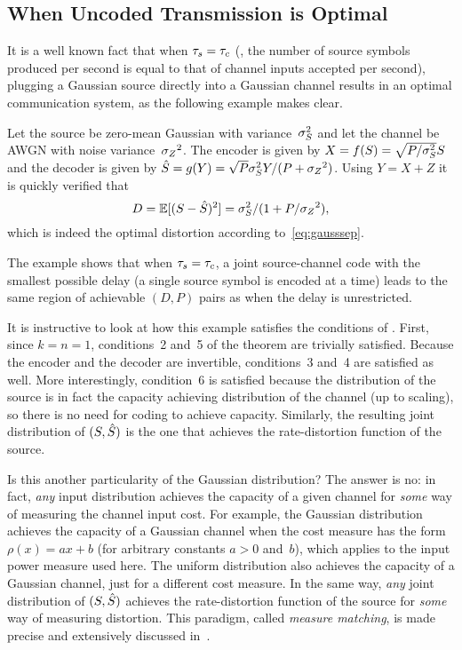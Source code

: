 \subsection{When Uncoded Transmission is Optimal}\label{sec:gaussuncoded}

It is a well known fact that when ${\tau_s} = {\tau_c}$ (\ie, the number of source symbols
produced per second is equal to that of channel inputs accepted per second),
plugging a Gaussian source directly into a Gaussian channel results in an
optimal communication system, as the following example makes clear.

\begin{example}
  \label{ex:gausssingle}
  Let the source be zero-mean Gaussian with variance~${\sigma_S^2}$ and let the channel
  be AWGN with noise variance~${{\sigma_Z}^2}$. The encoder is given by $X =
  f(S) = \sqrt{P/{\sigma_S^2}} S$ and the decoder is given by ${\hat{S}} = g(Y) = \sqrt{P}
  {\sigma_S^2} Y / (P + {{\sigma_Z}^2})$. Using $Y = X + Z$ it is quickly verified that
  \begin{equation*}
    D = \mathbb{E}[(S - {\hat{S}})^2] = {\sigma_S^2} / (1 + P/{{\sigma_Z}^2}),
  \end{equation*}
  which is indeed the optimal distortion according to~\eqref{eq:gausssep}.
\end{example}

The example shows that when ${\tau_s} = {\tau_c}$, a joint source-channel code with the
smallest possible delay (a single source symbol is encoded at a time) leads to
the same region of achievable $(D,P)$ pairs as when the delay is unrestricted.

It is instructive to look at how this example satisfies the conditions of
. First, since $k = n = 1$, conditions~2 and~5 of
the theorem are trivially satisfied. Because the encoder and the decoder are
invertible, conditions~3 and~4 are satisfied as well. More interestingly,
condition~6 is satisfied because the distribution of the source is in fact the
capacity achieving distribution of the channel (up to scaling), so there is no
need for coding to achieve capacity. Similarly, the resulting joint distribution
of $(S, {\hat{S}})$ is the one that achieves the rate-distortion function of the
source.

Is this another particularity of the Gaussian distribution? The answer is no: in
fact, \emph{any} input distribution achieves the capacity of a given channel for
\emph{some} way of measuring the channel input cost. For example, the Gaussian
distribution achieves the capacity of a Gaussian channel when the cost
measure has the form $\rho(x) = ax + b$ (for arbitrary constants $a > 0$
and~$b$), which applies to the input power measure used here. The uniform
distribution also achieves the capacity of a Gaussian channel, just for a
different cost measure. In the same way, \emph{any} joint distribution of $(S,
{\hat{S}})$ achieves the rate-distortion function of the source for \emph{some} way of
measuring distortion. This paradigm, called \emph{measure matching}, is made
precise and extensively discussed in~\cite{GastparRV2003}.


